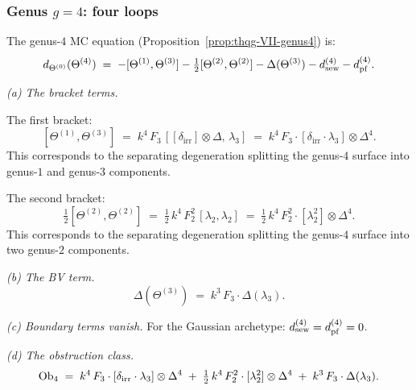 \subsubsection{Genus $g = 4$: four loops}
\label{subsubsec:thqg-VII-heis-g4}

\begin{computation}
\label{comp:thqg-VII-heis-g4}
The genus-$4$ MC equation
(Proposition~\ref{prop:thqg-VII-genus4}) is:
\begin{equation}\label{eq:thqg-VII-heis-mc-g4}
d_{\Theta^{(0)}}(\Theta^{(4)})
\;=\;
-[\Theta^{(1)},\Theta^{(3)}]
- \tfrac{1}{2}[\Theta^{(2)},\Theta^{(2)}]
- \Delta(\Theta^{(3)})
- d_{\mathrm{sew}}^{(4)}
- d_{\mathrm{pf}}^{(4)}.
\end{equation}

\medskip\noindent\emph{(a) The bracket terms.}

The first bracket:
\begin{equation}\label{eq:thqg-VII-heis-bracket13}
[\Theta^{(1)},\Theta^{(3)}]
\;=\;
k^4\, F_3\,
[[\delta_{\mathrm{irr}}] \otimes \Delta,\, \lambda_3]
\;=\;
k^4\, F_3 \cdot
[\delta_{\mathrm{irr}} \cdot \lambda_3]
\otimes \Delta^4.
\end{equation}
This corresponds to the separating degeneration splitting the
genus-$4$ surface into genus-$1$ and genus-$3$ components.

The second bracket:
\begin{equation}\label{eq:thqg-VII-heis-bracket22}
\tfrac{1}{2}[\Theta^{(2)},\Theta^{(2)}]
\;=\;
\tfrac{1}{2}\, k^4\, F_2^2\,
[\lambda_2,\lambda_2]
\;=\;
\tfrac{1}{2}\, k^4\, F_2^2 \cdot
[\lambda_2^2] \otimes \Delta^4.
\end{equation}
This corresponds to the separating degeneration splitting the
genus-$4$ surface into two genus-$2$ components.

\medskip\noindent\emph{(b) The BV term.}
\begin{equation}\label{eq:thqg-VII-heis-bv-g3}
\Delta(\Theta^{(3)})
\;=\;
k^3\, F_3 \cdot \Delta(\lambda_3).
\end{equation}

\medskip\noindent\emph{(c) Boundary terms vanish.}
For the Gaussian archetype: $d_{\mathrm{sew}}^{(4)} = d_{\mathrm{pf}}^{(4)} = 0$.

\medskip\noindent\emph{(d) The obstruction class.}
\begin{equation}\label{eq:thqg-VII-heis-obs4}
\mathrm{Ob}_4
\;=\;
k^4\, F_3 \cdot [\delta_{\mathrm{irr}} \cdot \lambda_3]
\otimes \Delta^4
\;+\;
\tfrac{1}{2}\, k^4\, F_2^2 \cdot [\lambda_2^2]
\otimes \Delta^4
\;+\;
k^3\, F_3 \cdot \Delta(\lambda_3).
\end{equation}


\end{computation}

